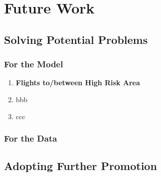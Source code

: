 \section{Future Work}

\subsection{Solving Potential Problems}

\subsubsection{For the Model}

\begin{enumerate}
    \item \textbf{Flights to/between High Risk Area}
    \item bbb
    \item ccc
\end{enumerate}

\subsubsection{For the Data}

\subsection{Adopting Further Promotion}



